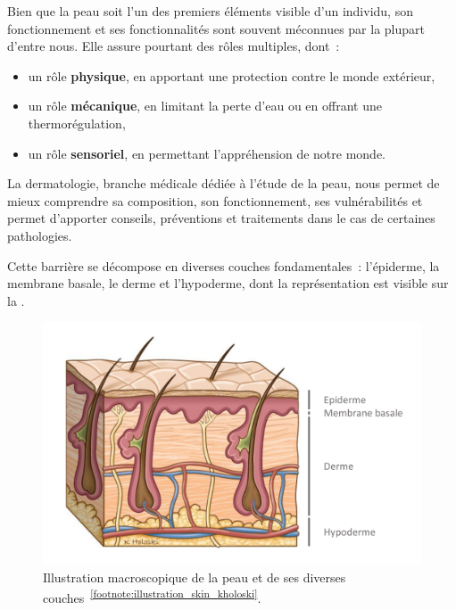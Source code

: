 Bien que la peau soit l'un des premiers éléments visible d'un individu, son fonctionnement et ses fonctionnalités sont souvent méconnues par la plupart d’entre nous. Elle assure pourtant des rôles multiples, dont~:
\begin{itemize}
    \item un rôle \textbf{physique}, en apportant une protection contre le monde extérieur,
    \item un rôle \textbf{mécanique}, en limitant la perte d’eau ou en offrant une thermorégulation,
    \item un rôle \textbf{sensoriel}, en permettant l'appréhension de notre monde.
\end{itemize}\par

La dermatologie, branche médicale dédiée à l’étude de la peau, nous permet de mieux comprendre sa composition, son fonctionnement, ses vulnérabilités et permet d’apporter conseils, préventions et traitements dans le cas de certaines pathologies.\par

Cette barrière se décompose en diverses couches fondamentales~: l’épiderme, la membrane basale, le derme et l’hypoderme, dont la représentation est visible sur la .\par
\begin{figure}[H]
    \centering
    \includegraphics[width=0.6\linewidth]{contents/chapter_1/resources/illustration_skin_kholoski.pdf}
    \caption{Illustration macroscopique de la peau et de ses diverses couches~\textsuperscript{\ref{footnote:illustration_skin_kholoski}}.}
    \label{fig:illustration_skin_kholoski}
\end{figure}\par 

\addtocounter{footnote}{1}

